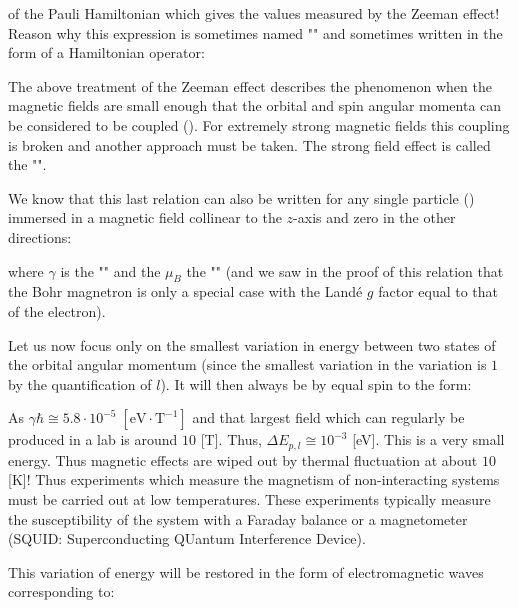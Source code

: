 	of the Pauli Hamiltonian which gives the values measured by the Zeeman effect! Reason why this expression is sometimes named "" and sometimes written in the form of a Hamiltonian operator:
	
	\begin{tcolorbox}[title=Remark,colframe=black,arc=10pt]
	The above treatment of the Zeeman effect describes the phenomenon when the magnetic fields are small enough that the orbital and spin angular momenta can be considered to be coupled (). For extremely strong magnetic fields this coupling is broken and another approach must be taken. The strong field effect is called the "".
	\end{tcolorbox}
	We know that this last relation can also be written for any single particle () immersed in a magnetic field collinear to the $z$-axis and zero in the other directions:
	
	where $\gamma$ is the "" and the $\mu_B$ the "" (and we saw in the proof of this relation that the Bohr magnetron is only a special case with the Landé $g$ factor equal to that of the electron).
	
	Let us now focus only on the smallest variation in energy between two states of the orbital angular momentum (since the smallest variation in the variation is $1$ by the quantification of $l$). It will then always be by equal spin to the form:
	
	\begin{tcolorbox}[title=Remark,colframe=black,arc=10pt]
	As $\gamma\hbar\cong 5.8\cdot 10^{-5}\;[\text{eV}\cdot\text{T}^{-1}]$ and that largest field which can regularly be produced in a lab is around $10$ [T]. Thus, $\Delta E_{p,l}\cong 10^{-3}$ [eV]. This is a very small energy. Thus magnetic effects are wiped out by thermal fluctuation at about $10$ [K]! Thus experiments which measure the magnetism of non-interacting systems must be carried out at low temperatures. These experiments typically measure the susceptibility
of the system with a Faraday balance or a magnetometer (SQUID: Superconducting QUantum Interference Device).
	\end{tcolorbox}
	This variation of energy will be restored in the form of electromagnetic waves corresponding to:
	
